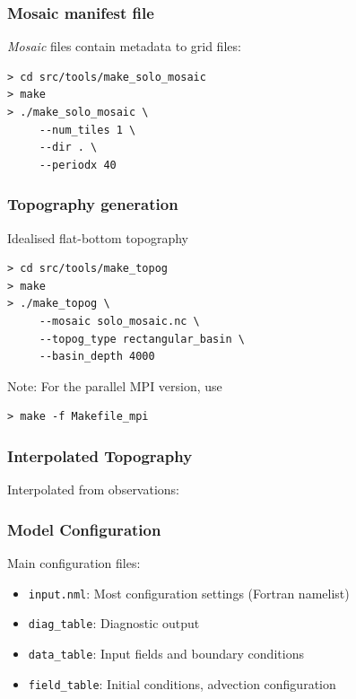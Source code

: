 \documentclass[red]{beamer}
\begin{document}
\begin{frame}[fragile]
    \frametitle{Mosaic manifest file}
    
    \textit{Mosaic} files contain metadata to grid files:
    \begin{lstlisting}
> cd src/tools/make_solo_mosaic
> make
> ./make_solo_mosaic \
     --num_tiles 1 \
     --dir . \
     --periodx 40
    \end{lstlisting}
\end{frame}

\begin{frame}[fragile]
    \frametitle{Topography generation}
   
    Idealised flat-bottom topography
    \begin{lstlisting}
> cd src/tools/make_topog
> make
> ./make_topog \
     --mosaic solo_mosaic.nc \
     --topog_type rectangular_basin \
     --basin_depth 4000
    \end{lstlisting}

    Note: For the parallel MPI version, use
    \begin{lstlisting}
> make -f Makefile_mpi
    \end{lstlisting}
\end{frame}

\begin{frame}
    \frametitle{Interpolated Topography}

    Interpolated from observations:
    

\end{frame}
\begin{frame}
    \frametitle{Model Configuration}
    
    Main configuration files:
    \begin{itemize}
        \item \lstinline|input.nml|: Most configuration settings (Fortran
            namelist)
        \item \lstinline|diag_table|: Diagnostic output
        \item \lstinline|data_table|: Input fields and boundary conditions
        \item \lstinline|field_table|: Initial conditions, advection
            configuration
    \end{itemize}
\end{frame}
\end{document}
